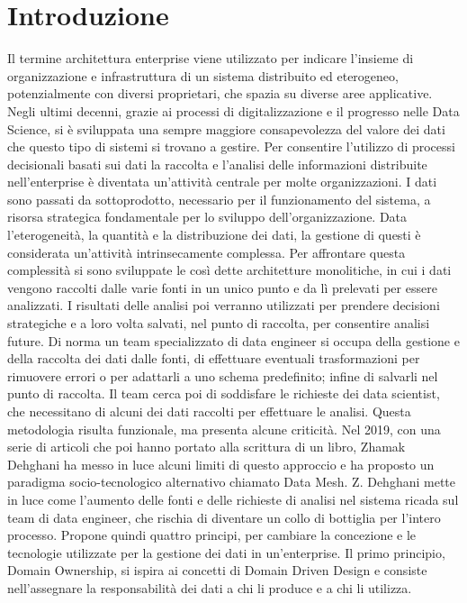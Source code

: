 \documentclass[12pt]{report}
\begin{document}
\chapter*{Introduzione}
Il termine architettura enterprise viene utilizzato per indicare l'insieme di organizzazione e infrastruttura di un sistema distribuito ed eterogeneo, potenzialmente con diversi proprietari, che spazia su diverse aree applicative.
Negli ultimi decenni, grazie ai processi di digitalizzazione e il progresso nelle Data Science, si è sviluppata una sempre maggiore consapevolezza del valore dei dati che questo tipo di sistemi si trovano a gestire.
Per consentire l'utilizzo di processi decisionali basati sui dati la raccolta e l'analisi delle informazioni distribuite nell'enterprise è diventata un'attività centrale per molte organizzazioni.
I dati sono passati da sottoprodotto, necessario per il funzionamento del sistema, a risorsa strategica fondamentale per lo sviluppo dell'organizzazione.
Data l'eterogeneità, la quantità e la distribuzione dei dati, la gestione di questi è considerata un'attività intrinsecamente complessa.
Per affrontare questa complessità si sono sviluppate le così dette architetture monolitiche, in cui i dati vengono raccolti dalle varie fonti in un unico punto e da lì prelevati per essere analizzati.
I risultati delle analisi poi verranno utilizzati per prendere decisioni strategiche e a loro volta salvati, nel punto di raccolta, per consentire analisi future.
Di norma un team specializzato di data engineer si occupa della gestione e della raccolta dei dati dalle fonti, di effettuare eventuali trasformazioni per rimuovere errori o per adattarli a uno schema predefinito; infine di salvarli nel punto di raccolta.
Il team cerca poi di soddisfare le richieste dei data scientist, che necessitano di alcuni dei dati raccolti per effettuare le analisi.
Questa metodologia risulta funzionale, ma presenta alcune criticità.
Nel 2019, con una serie di articoli che poi hanno portato alla scrittura di un libro, Zhamak Dehghani ha messo in luce alcuni limiti di questo approccio e ha proposto un paradigma socio-tecnologico alternativo chiamato Data Mesh.
Z. Dehghani mette in luce come l'aumento delle fonti e delle richieste di analisi nel sistema ricada sul team di data engineer, che rischia di diventare un collo di bottiglia per l'intero processo.
Propone quindi quattro principi, per cambiare la concezione e le tecnologie utilizzate per la gestione dei dati in un'enterprise. 
Il primo principio, Domain Ownership, si ispira ai concetti di Domain Driven Design e consiste nell'assegnare la responsabilità dei dati a chi li produce e a chi li utilizza.
\end{document}
